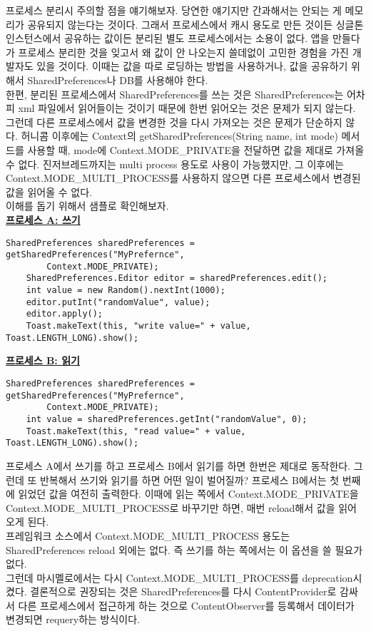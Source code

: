 프로세스 분리시 주의할 점을 얘기해보자.
당연한 얘기지만 간과해서는 안되는 게 메모리가 공유되지 않는다는 것이다. 
그래서 프로세스에서 캐시 용도로 만든 것이든 싱글톤 인스턴스에서 공유하는 값이든 분리된 별도 프로세스에서는 소용이 없다.
앱을 만들다가 프로세스 분리한 것을 잊고서 왜 값이 안 나오는지 쓸데없이 고민한 경험을 가진 개발자도 있을 것이다.
이때는 값을 따로 로딩하는 방법을 사용하거나, 값을 공유하기 위해서 SharedPreferences나 DB를 사용해야 한다.\\

한편, 분리된 프로세스에서 SharedPreferences를 쓰는 것은  
SharedPreferences는 어차피 xml 파일에서 읽어들이는 것이기 때문에 한번 읽어오는 것은 문제가 되지 않는다.
그런데 다른 프로세스에서 값을 변경한 것을 다시 가져오는 것은 문제가 단순하지 않다.
허니콤 이후에는 Context의 getSharedPreferences(String name, int mode) 메서드를 사용할 때, mode에
Context.MODE\_PRIVATE을 전달하면 값을 제대로 가져올 수 없다.
진저브레드까지는 multi process 용도로 사용이 가능했지만, 그 이후에는 Context.MODE\_MULTI\_PROCESS를 사용하지 않으면 다른 프로세스에서 변경된 값을 읽어올 수 없다.\\

이해를 돕기 위해서 샘플로 확인해보자.\\
\underline{\bfseries 프로세스 A: 쓰기}
\begin{lstlisting}[frame=single] 
    SharedPreferences sharedPreferences = getSharedPreferences("MyPrefernce", 
    	Context.MODE_PRIVATE);
    SharedPreferences.Editor editor = sharedPreferences.edit();
    int value = new Random().nextInt(1000);
    editor.putInt("randomValue", value);
    editor.apply();
    Toast.makeText(this, "write value=" + value, Toast.LENGTH_LONG).show();
\end{lstlisting}

\underline{\bfseries 프로세스 B: 읽기}
\begin{lstlisting}[frame=single] 
	SharedPreferences sharedPreferences = getSharedPreferences("MyPrefernce", 
		Context.MODE_PRIVATE);
    int value = sharedPreferences.getInt("randomValue", 0);
    Toast.makeText(this, "read value=" + value, Toast.LENGTH_LONG).show();
\end{lstlisting}

프로세스 A에서 쓰기를 하고 프로세스 B에서 읽기를 하면 한번은 제대로 동작한다.
그런데 또 반복해서 쓰기와 읽기를 하면 어떤 일이 벌어질까?
프로세스 B에서는 첫 번째에 읽었던 값을 여전히 출력한다.
이때에 읽는 쪽에서 Context.MODE\_PRIVATE을 Context.MODE\_MULTI\_PROCESS로 바꾸기만 하면, 매번 reload해서 값을 읽어오게 된다.\\

프레임워크 소스에서 Context.MODE\_MULTI\_PROCESS 용도는 SharedPreferences reload 외에는 없다. 
즉 쓰기를 하는 쪽에서는 이 옵션을 쓸 필요가 없다.\\

그런데 마시멜로에서는 다시 Context.MODE\_MULTI\_PROCESS를 deprecation시켰다. 
결론적으로 권장되는 것은 SharedPreferences를 다시 ContentProvider로 감싸서 다른 프로세스에서 접근하게 하는 것으로 ContentObserver를 등록해서 데이터가 변경되면 requery하는 방식이다.


